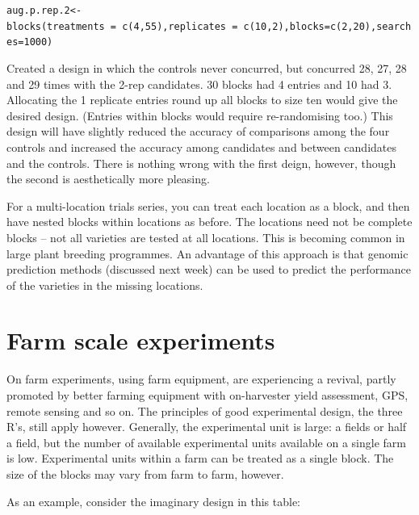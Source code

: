 \documentclass[
]{book}
\makeatletter
\newenvironment{kframe}{%
\medskip{}
\setlength{\fboxsep}{.8em}
 \def\at@end@of@kframe{}%
 \ifinner\ifhmode%
  \def\at@end@of@kframe{\end{minipage}}%
  \begin{minipage}{\columnwidth}%
 \fi\fi%
 \def\FrameCommand##1{\hskip\@totalleftmargin \hskip-\fboxsep
 \colorbox{shadecolor}{##1}\hskip-\fboxsep
     \hskip-\linewidth \hskip-\@totalleftmargin \hskip\columnwidth}%
 \MakeFramed {\advance\hsize-\width
   \@totalleftmargin\z@ \linewidth\hsize
   \@setminipage}}%
 {\par\unskip\endMakeFramed%
 \at@end@of@kframe}
\newenvironment{rmdblock}[1]
  {
  \begin{itemize}
  \renewcommand{\labelitemi}{
    \raisebox{-.7\height}[0pt][0pt]{
      {\setkeys{Gin}{width=3em,keepaspectratio}\texttt{[image: images/\#1]}}
    }
  }
  \setlength{\fboxsep}{1em}
  \begin{kframe}
  \item
  }
  {
  \end{kframe}
  \end{itemize}
  }
\newenvironment{rmdnote}
  {\begin{rmdblock}{note}}
  {\end{rmdblock}}
\makeatother
\begin{document}
\texttt{aug.p.rep.2\textless{}-blocks(treatments\ =\ c(4,55),replicates\ =\ c(10,2),blocks=c(2,20),searches=1000)}

Created a design in which the controls never concurred, but concurred 28, 27, 28 and 29 times with the 2-rep candidates. 30 blocks had 4 entries and 10 had 3. Allocating the 1 replicate entries round up all blocks to size ten would give the desired design. (Entries within blocks would require re-randomising too.) This design will have slightly reduced the accuracy of comparisons among the four controls and increased the accuracy among candidates and between candidates and the controls. There is nothing wrong with the first deign, however, though the second is aesthetically more pleasing.

\begin{rmdnote}
For a multi-location trials series, you can treat each location as a block, and then have nested blocks within locations as before. The locations need not be complete blocks -- not all varieties are tested at all locations. This is becoming common in large plant breeding programmes. An advantage of this approach is that genomic prediction methods (discussed next week) can be used to predict the performance of the varieties in the missing locations.
\end{rmdnote}

\hypertarget{farm-scale-experiments}{%
\section{Farm scale experiments}\label{farm-scale-experiments}}

On farm experiments, using farm equipment, are experiencing a revival, partly promoted by better farming equipment with on-harvester yield assessment, GPS, remote sensing and so on. The principles of good experimental design, the three R's, still apply however. Generally, the experimental unit is large: a fields or half a field, but the number of available experimental units available on a single farm is low. Experimental units within a farm can be treated as a single block. The size of the blocks may vary from farm to farm, however.

As an example, consider the imaginary design in this table:
\end{document}
